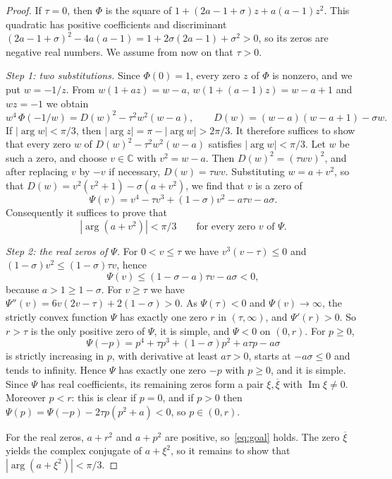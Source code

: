 \documentclass{amsart}
\theoremstyle{remark}
\numberwithin{equation}{section}
\newcommand{\C}{\mathbb{C}}
\begin{document}
\begin{proof}
If $\tau=0$, then $\Phi$ is the square of
$1+(2a-1+\sigma)z+a(a-1)z^2$. This quadratic has positive coefficients and
discriminant $(2a-1+\sigma)^2-4a(a-1)=1+2\sigma(2a-1)+\sigma^2>0$, so its
zeros are negative real numbers. We assume from now on that $\tau>0$.

\emph{Step 1: two substitutions.} Since $\Phi(0)=1$, every zero $z$ of
$\Phi$ is nonzero, and we put $w=-1/z$. From $w(1+az)=w-a$,
$w(1+(a-1)z)=w-a+1$ and $wz=-1$ we obtain
\[
w^4\,\Phi(-1/w)=D(w)^2-\tau^2w^2(w-a),\qquad
D(w)=(w-a)(w-a+1)-\sigma w .
\]
If $|\arg w|<\pi/3$, then $|\arg z|=\pi-|\arg w|>2\pi/3$. It therefore
suffices to show that every zero $w$ of $D(w)^2-\tau^2w^2(w-a)$ satisfies
$|\arg w|<\pi/3$. Let $w$ be such a zero, and choose $v\in\C$ with
$v^2=w-a$. Then $D(w)^2=(\tau wv)^2$, and after replacing $v$ by $-v$ if
necessary, $D(w)=\tau wv$. Substituting $w=a+v^2$, so that
$D(w)=v^2(v^2+1)-\sigma(a+v^2)$, we find that $v$ is a zero of
\[
\Psi(v)=v^4-\tau v^3+(1-\sigma)v^2-a\tau v-a\sigma .
\]
Consequently it suffices to prove that
\begin{equation}\label{eq:goal}
|\arg(a+v^2)|<\pi/3\qquad\text{for every zero $v$ of $\Psi$.}
\end{equation}

\emph{Step 2: the real zeros of $\Psi$.} For $0<v\le\tau$ we have
$v^3(v-\tau)\le 0$ and $(1-\sigma)v^2\le(1-\sigma)\tau v$, hence
\[
\Psi(v)\le(1-\sigma-a)\tau v-a\sigma<0 ,
\]
because $a>1\ge 1-\sigma$. For $v\ge\tau$ we have
$\Psi''(v)=6v(2v-\tau)+2(1-\sigma)>0$. As $\Psi(\tau)<0$ and
$\Psi(v)\to\infty$, the strictly convex function $\Psi$ has exactly one zero
$r$ in $(\tau,\infty)$, and $\Psi'(r)>0$. So $r>\tau$ is the only positive
zero of $\Psi$, it is simple, and $\Psi<0$ on $(0,r)$. For $p\ge 0$,
\[
\Psi(-p)=p^4+\tau p^3+(1-\sigma)p^2+a\tau p-a\sigma
\]
is strictly increasing in $p$, with derivative at least $a\tau>0$, starts
at $-a\sigma\le 0$ and tends to infinity. Hence $\Psi$ has exactly one zero
$-p$ with $p\ge 0$, and it is simple. Since $\Psi$ has real coefficients,
its remaining zeros form a pair $\xi,\overline{\xi}$ with
$\operatorname{Im}\xi\ne 0$. Moreover $p<r$: this is clear if $p=0$, and if
$p>0$ then $\Psi(p)=\Psi(-p)-2\tau p(p^2+a)<0$, so $p\in(0,r)$.

For the real zeros, $a+r^2$ and $a+p^2$ are positive, so~\eqref{eq:goal}
holds. The zero $\overline{\xi}$ yields the complex conjugate of $a+\xi^2$,
so it remains to show that $|\arg(a+\xi^2)|<\pi/3$.


\end{proof}
\end{document}
